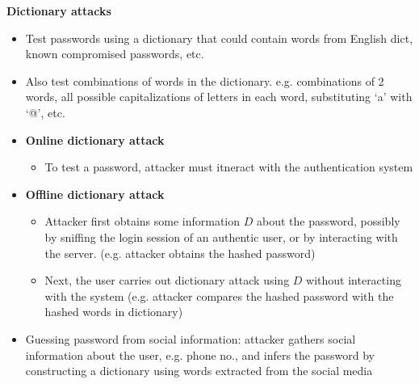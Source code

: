 \documentclass[landscape,a4paper]{extarticle}
\begin{document}
\begin{multicols*}{5}
    \textbf{Dictionary attacks}
    \begin{itemize}
        \item Test passwords using a dictionary that could contain words from English dict, known
        compromised passwords, etc.
        \item Also test combinations of words in the dictionary. e.g. combinations of 2 words, all possible capitalizations
        of letters in each word, substituting `a' with `@', etc.
        \item \textbf{Online dictionary attack}
        \begin{itemize}
            \item To test a password, attacker must itneract with the authentication system
        \end{itemize}
        \item \textbf{Offline dictionary attack}
        \begin{itemize}
            \item Attacker first obtains some information $D$ about the password, possibly by sniffing the login session
            of an authentic user, or by interacting with the server. (e.g. attacker obtains the hashed password)
            \item Next, the user carries out dictionary attack using $D$ without interacting with the system (e.g. attacker
            compares the hashed password with the hashed words in dictionary)
        \end{itemize}
        \item Guessing password from social information: attacker gathers social information
        about the user, e.g. phone no., and infers the password by constructing a dictionary
        using words extracted from the social media
    \end{itemize}


\end{multicols*}
\end{document}

